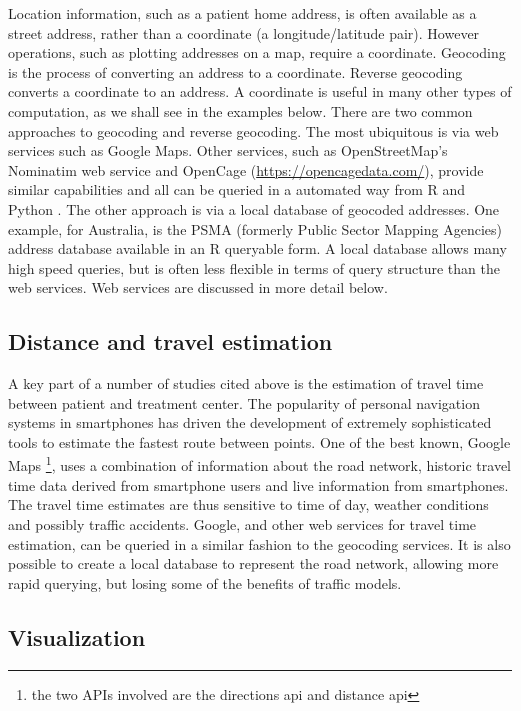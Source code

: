 \documentclass[utf8]{frontiersHLTH}
\begin{document}
Location information, such as a patient home address, is often
available as a street address, rather than a coordinate (a
longitude/latitude pair). However operations, such as plotting
addresses on a map, require a coordinate. Geocoding is the process of
converting an address to a coordinate. Reverse geocoding converts a
coordinate to an address. A coordinate is useful in many other types
of computation, as we shall see in the examples below. There are two
common approaches to geocoding and reverse geocoding. The most
ubiquitous is via web services such as Google Maps. Other services,
such as OpenStreetMap's Nominatim web service and OpenCage
(\url{https://opencagedata.com/}), provide similar capabilities and
all can be queried in a automated way from R and Python
\cite{opencage}. The other approach is via a local database of
geocoded addresses. One example, for Australia, is the PSMA (formerly
Public Sector Mapping Agencies) address database available in an R
queryable form. A local database allows many high speed queries, but
is often less flexible in terms of query structure than the web
services. Web services are discussed in more detail below.

\subsection{Distance and travel estimation}\label{distance-and-travel-estimation} 

A key part of a number of studies cited above is the estimation of
travel time between patient and treatment center. The popularity of
personal navigation systems in smartphones has driven the development
of extremely sophisticated tools to estimate the fastest route between
points. One of the best known, Google Maps \footnote{the two APIs
  involved are the directions api and distance api}, uses a
combination of information about the road network, historic travel
time data derived from smartphone users and live information from
smartphones. The travel time estimates are thus sensitive to time of
day, weather conditions and possibly traffic accidents. Google, and
other web services for travel time estimation, can be queried in a
similar fashion to the geocoding services. It is also possible to
create a local database to represent the road network, allowing more
rapid querying, but losing some of the benefits of traffic models.

\subsection{Visualization}\label{visualization} 
\end{document}

